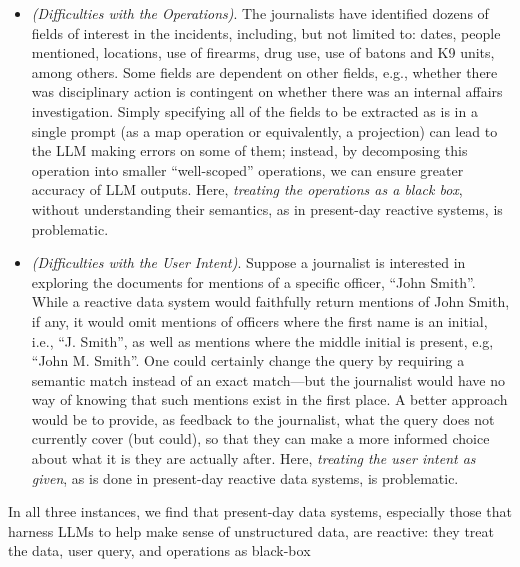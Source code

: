 \begin{example}
\begin{itemize}
         
         \item \textit{(Difficulties with the Operations)}.
         The journalists have identified dozens of fields
         of interest in the incidents, including, but not limited
         to: dates, people mentioned, locations, use of firearms, drug use, use of batons and K9 units, among others. 
         Some fields are dependent on other fields,
         e.g., whether there was disciplinary action is contingent on whether there was an internal affairs
         investigation. 
         Simply specifying all of the fields to be extracted
         as is in a single prompt (as a map operation
         or equivalently, a projection)
         can lead to the LLM making errors
         on some of them;
         instead, by decomposing this operation into smaller 
         ``well-scoped'' operations, we can ensure 
         greater accuracy of LLM outputs. 
         Here, {\em treating the operations as a black box},
         without understanding their semantics,
         as in present-day reactive systems, is
         problematic. 

         
         \item \textit{(Difficulties with the User Intent)}. 
         Suppose a journalist is interested in exploring the documents for mentions of a specific officer, ``John Smith''. 
         While a reactive data system would faithfully return
         mentions of John Smith, if any, it would omit
         mentions of officers where the first name is an initial,
         i.e., ``J. Smith'', as well as mentions where
         the middle initial is present, e.g, ``John M. Smith''.
         One could certainly change the  query by requiring a semantic match 
         instead of an exact match---but the journalist 
         would have no way of knowing that such mentions
         exist in the first place.
         A better approach would be to provide, as feedback
         to the journalist, what the query does not currently cover (but could), 
         so that they can make a more informed choice
         about what it is they are actually after.
         Here, {\em treating the user intent as given}, as
         is done in present-day reactive data systems, is problematic.

\end{itemize}
\end{example}
In all three instances, we find that present-day data systems,
especially those that harness LLMs
to help make sense of unstructured data, 
are reactive:
they treat the data, user query, and operations as black-box

